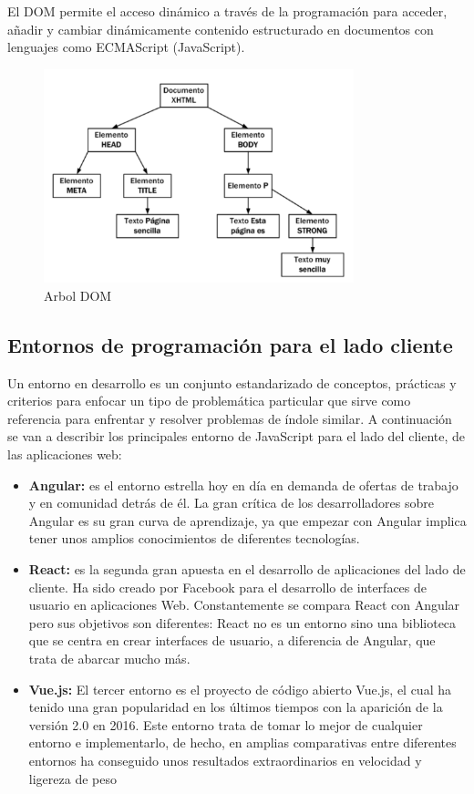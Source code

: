 El DOM permite el acceso dinámico a través de la programación para acceder, añadir y cambiar dinámicamente contenido estructurado en documentos con lenguajes como ECMAScript (JavaScript).
\begin{figure}[!h]
    \centering
    \includegraphics[width=90mm]{img/introduccion/arbol_dom.png}
    \caption{Arbol DOM}
\end{figure}

\subsection{Entornos de programación para el lado cliente}
Un entorno en desarrollo es un conjunto estandarizado de conceptos, prácticas y criterios para enfocar un tipo de problemática particular que sirve como referencia para enfrentar y resolver problemas de índole similar. A continuación se van a describir los principales entorno de JavaScript para el lado del cliente, de las aplicaciones web:
\begin{itemize}
    \item \textbf{Angular: } es el entorno estrella hoy en día en demanda de ofertas de trabajo y en comunidad detrás de él.
    La gran crítica de los desarrolladores sobre Angular es su gran curva de aprendizaje, ya que empezar con Angular implica tener unos amplios conocimientos de diferentes tecnologías.
    \item \textbf{React: }es la segunda gran apuesta en el desarrollo de aplicaciones del lado de cliente. Ha sido creado por Facebook para el desarrollo de interfaces de usuario en aplicaciones Web. Constantemente se compara React con Angular pero sus objetivos son diferentes: React no es un entorno sino una biblioteca que se centra en crear interfaces de usuario, a diferencia de Angular, que trata de abarcar mucho más.
    \item \textbf{Vue.js: } El tercer entorno es el proyecto de código abierto Vue.js, el cual ha tenido una gran popularidad en los últimos tiempos con la aparición de la versión 2.0 en 2016. Este entorno trata de tomar lo mejor de cualquier entorno e implementarlo, de hecho, en amplias comparativas entre diferentes entornos ha conseguido unos resultados extraordinarios en velocidad y ligereza de peso
\end{itemize}
